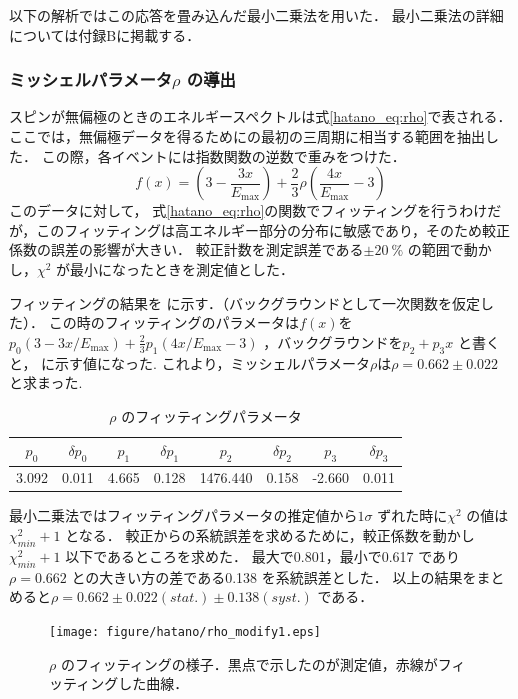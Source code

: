 以下の解析ではこの応答を畳み込んだ最小二乗法を用いた．
最小二乗法の詳細については付録Bに掲載する．

\subsubsection{ミッシェルパラメータ$\rho$ の導出}
スピンが無偏極のときのエネルギースペクトルは式\eqref{hatano_eq:rho}で表される．
ここでは，無偏極データを得るためにの最初の三周期に相当する範囲を抽出した．
この際，各イベントには指数関数の逆数で重みをつけた．
\begin{equation}
  f(x)=(3 - \frac{3x}{E_\mathrm{max}})+\frac{2}{3}\rho(\frac{4x}{E_\mathrm{max}} - 3)
  \label{hatano_eq:rho}
\end{equation}
このデータに対して， 式\eqref{hatano_eq:rho}の関数でフィッティングを行うわけだが，このフィッティングは高エネルギー部分の分布に敏感であり，そのため較正係数の誤差の影響が大きい．
較正計数を測定誤差である$\pm 20~\%$ の範囲で動かし，$\chi^2$ が最小になったときを測定値とした．

フィッティングの結果を に示す．（バックグラウンドとして一次関数を仮定した）．
この時のフィッティングのパラメータは$f(x)$を$p_0(3 - 3x / E_\mathrm{max}) + \frac{2}{3} p_{1} (4x / E_\mathrm{max} - 3)$ ，バックグラウンドを$p_2+p_3x$ と書くと， に示す値になった.
これより，ミッシェルパラメータ$\rho$は$\rho=0.662 \pm 0.022$ と求まった.

\begin{table}[hbt]
\centering
\caption{$\rho$ のフィッティングパラメータ}
\begin{tabular}{cc|cc|cc|cc}
$p_0$ & $\delta p_0$ & $p_1$ & $\delta p_1$ & $p_2$ & $\delta p_2$ & $p_3$ & $\delta p_3$ \\ \hline
3.092 & 0.011 & 4.665 & 0.128 & 1476.440 & 0.158 & -2.660 & 0.011
\end{tabular}
\label{hatano_tab:rho}
\end{table}

最小二乗法ではフィッティングパラメータの推定値から$1\sigma$ ずれた時に$\chi^2$ の値は$\chi^2_{min}+1$ となる\cite{leo}． 
較正からの系統誤差を求めるために，較正係数を動かし$\chi^{2}_{min} + 1$ 以下であるところを求めた．
最大で0.801，最小で0.617 であり$\rho=0.662$ との大きい方の差である0.138 を系統誤差とした．
以上の結果をまとめると$\rho=0.662 \pm 0.022 (stat.) \pm 0.138 (syst.)$ である．

\begin{figure}[hbt]
\centering
\texttt{[image: figure/hatano/rho\_modify1.eps]}
\caption{$\rho$ のフィッティングの様子．黒点で示したのが測定値，赤線がフィッティングした曲線．}
\label{hatano_fig:rho}
\end{figure}

